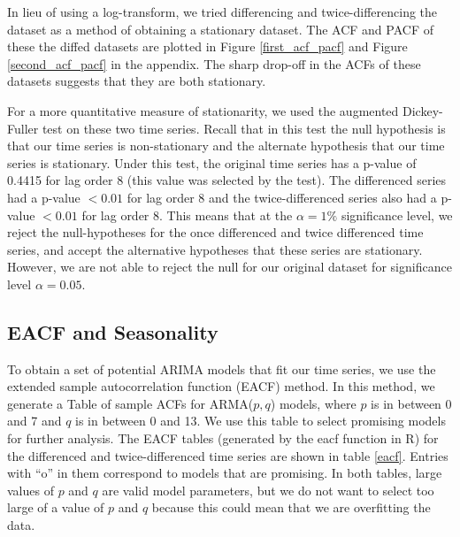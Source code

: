 \documentclass[11pt]{paper}
\begin{document}
In lieu of using a log-transform, we tried differencing and twice-differencing the dataset as a method of obtaining a stationary dataset. The ACF and PACF of these the diffed datasets are plotted in Figure \ref{first_acf_pacf} and Figure \ref{second_acf_pacf} in the appendix. The sharp drop-off in the ACFs of these datasets suggests that they are both stationary.




For a more quantitative measure of stationarity, we used the augmented Dickey-Fuller test on these two time series. Recall that in this test the null hypothesis is that our time series is non-stationary and the alternate hypothesis that our time series is stationary. Under this test, the original time series has a p-value of 0.4415 for lag order 8 (this value was selected by the test). The differenced series had a p-value $< 0.01$ for lag order 8 and the twice-differenced series also had a p-value $<0.01$ for lag order 8. This means that at the $\alpha = 1\%$ significance level, we reject the null-hypotheses for the once differenced and twice differenced time series, and accept the alternative hypotheses that these series are stationary. However, we are not able to reject the null for our original dataset for significance level $\alpha=0.05$.

\subsection{EACF and Seasonality}

To obtain a set of potential ARIMA models that fit our time series, we use the extended sample autocorrelation function (EACF) method. In this method, we generate a Table of sample ACFs for ARMA($p, q$) models, where $p$ is in between 0 and 7 and $q$ is in between 0 and 13. We use this table to select promising models for further analysis. The EACF tables (generated by the eacf function in R) for the differenced and twice-differenced time series are shown in table \ref{eacf}. Entries with ``o'' in them correspond to models that are promising. In both tables, large values of $p$ and $q$ are valid model parameters, but we do not want to select too large of a value of $p$ and $q$ because this could mean that we are overfitting the data. 
\end{document}
